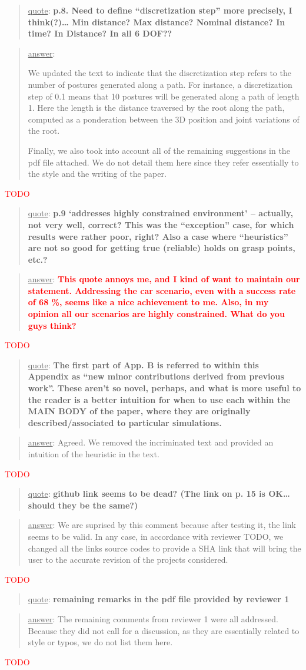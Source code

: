 \documentclass[a4paper]{article}
\newcommand{\ndone}[0]{\textcolor{red}{TODO}}
\newcommand\quot[1]{\begin{quote} \underline{quote}: \textbf{#1}\end{quote}}
\newcommand\as[1]{\begin{quote} \underline{answer}: {#1}\end{quote} }
\begin{document}
\quot{
p.8. Need to define ``discretization step'' more precisely, I think(?)… Min distance? Max distance? Nominal distance? In time? In Distance? In all 6 DOF??
}

\as{We updated the text to indicate that the discretization step refers to the number of postures generated along a path. For instance, a discretization step of 0.1 means
that 10 postures will be generated along a path of length 1. Here the length is the distance traversed by the root along the path, computed as a ponderation between the 3D position and joint variations of the root.

Finally, we also took into account all of the remaining suggestions in the pdf file attached. We do not detail them here since they refer essentially to the style 
and the writing of the paper.}\ndone

\quot{
p.9 ‘addresses highly constrained environment’ – actually, not very well, correct? This was the “exception” case, for which results were rather poor, right? Also a case where “heuristics” are not so good for getting true (reliable) holds on grasp points, etc.?
}

\as{\textbf{\textcolor{red}{This quote annoys me, and I kind of want to maintain our statement. Addressing the car scenario, even with a success rate of 68 \%, seems like a nice achievement to me.
Also, in my opinion all our scenarios are highly constrained. What do you guys think?}}}\ndone

\quot{
The first part of App. B is referred to within this Appendix as “new minor contributions derived from previous work”. These aren’t so novel, perhaps, and what is more useful to the reader is a better intuition for when to use each within the MAIN BODY of the paper, where they are originally described/associated to particular simulations.
}

\as{Agreed. We removed the incriminated text and provided an intuition of the heuristic in the text.}\ndone

\quot{github link seems to be dead? (The link on p. 15 is OK… should they be the same?)}

\as{We are suprised by this comment because after testing it, the link seems to be valid. In any case, in accordance with reviewer TODO, we changed all the links source codes to provide a SHA link that will bring the user to the accurate revision of the projects considered.}\ndone

\quot{remaining remarks in the pdf file provided by reviewer 1}
\as{The remaining comments from reviewer 1 were all addressed. Because they did not call for a discussion, as they are essentially related to style or typos, we do not list them here.}\ndone
\end{document}
